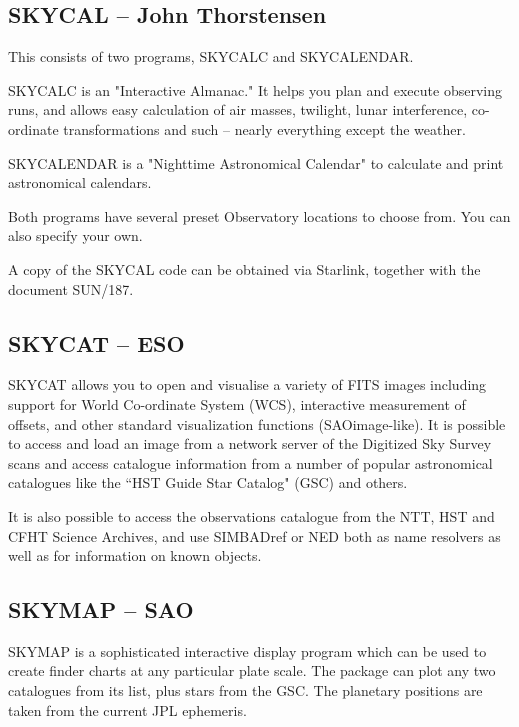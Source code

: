 \documentclass[twoside,11pt]{article}
\newcommand{\htmladdnormallink}[2]{#1}
\newcommand{\xref}[3]{#1}
\newcommand{\xlabel}[1]{}
\newcommand{\SUNSKYref}{\xref{SUN/187}{sun187}{}}
\newcommand{\SKYCATref}{\htmladdnormallink{SKYCAT}{http://arch-http.hq.eso.org/skycat/}}
\newcommand{\GSCref}{\htmladdnormallink{GSC}{http://www-gsss.stsci.edu/casbhome.html}}
\newcommand{\NEDref}{\htmladdnormallink{NED}{http://ds.internic.net/cgi-bin/enthtml/database/ned.b}}
\begin{document}
\subsection{SKYCAL -- John Thorstensen} \xlabel{SKYCAL}
\label{sec:skycal}
 
This consists of two programs, SKYCALC and SKYCALENDAR.

SKYCALC is an "Interactive Almanac." It helps you plan and execute observing
runs, and allows easy calculation of air masses, twilight, lunar interference, 
co-ordinate transformations and such -- nearly everything except the weather. 

SKYCALENDAR is a "Nighttime Astronomical Calendar" to calculate and
print astronomical calendars. 

Both programs have several preset Observatory locations to choose from.
You can also specify your own.

A copy of the SKYCAL code can be obtained via Starlink, together with the
document {\SUNSKYref}.

\subsection{{\SKYCATref} -- ESO}  \xlabel{SKYCAT}
\label{sec:skycat}
 
{\SKYCATref} allows you to open and visualise a variety of FITS images including
support for World Co-ordinate System (WCS), interactive measurement of offsets,
and other standard visualization functions (SAOimage-like). It is possible to
access and load an image from a network server of the Digitized Sky Survey
scans and access catalogue information from a number of popular astronomical
catalogues like the ``HST Guide Star Catalog" (GSC) and others. 
      
It is also possible to access the observations catalogue from the NTT, HST and
CFHT Science Archives, and use {SIMBADref} or {\NEDref} both as name resolvers as well as
for information on known objects. 


\subsection{SKYMAP -- SAO} \xlabel{SKYMAPSAO}
\label{sec:skymapsao}
 
SKYMAP is a sophisticated interactive display program which can be used to
create finder charts at any particular plate scale.  
The package can plot any
two catalogues from its list, plus stars from the {\GSCref}. The planetary positions
are taken from the current JPL ephemeris. 
\end{document}
